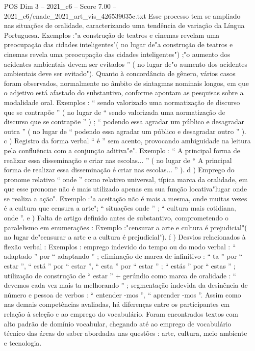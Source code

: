 \begin{textsample}{POS Dim 3 – 2021\_c6 – Score 7.00 – 2021\_c6/enade\_2021\_art\_vis\_426539035c.txt}
Esse processo tem se ampliado nas situações de oralidade, caracterizando uma tendência de variação da Língua Portuguesa.
Exemplos :"a construção de teatros e cinemas revelam uma preocupação das cidades inteligentes"( no lugar de"a construção de teatros e cinemas revela uma preocupação das cidades inteligentes") ;"o aumento dos acidentes ambientais devem ser evitados ” ( no lugar de"o aumento dos acidentes ambientais deve ser evitado").
Quanto à concordância de gênero, vários casos foram observados, normalmente no âmbito de sintagmas nominais longos, em que o adjetivo está afastado do substantivo, conforme apontam as pesquisas sobre a modalidade oral.
Exemplos : “ sendo valorizado uma normatização de discurso que se contrapõe ” ( no lugar de “ sendo valorizada uma normatização de discurso que se contrapõe ” ) ; “ podendo essa agradar um público e desagradar outra ” ( no lugar de “ podendo essa agradar um público e desagradar outro ” ). c ) Registro da forma verbal “ é ” sem acento, provocando ambiguidade na leitura pela confluência com a conjunção aditiva"e".
Exemplo : “ A principal forma de realizar essa disseminação e criar nas escolas... ” ( no lugar de “ A principal forma de realizar essa disseminação é criar nas escolas... ” ). d ) Emprego do pronome relativo “ onde ” como relativo universal, típica marca da oralidade, em que esse pronome não é mais utilizado apenas em sua função locativa"lugar onde se realiza a ação".
Exemplo :"a aceitação não é mais a mesma, onde muitas vezes é a cultura que censura a arte"; “ situações onde ” ; “ cultura mais cotidiana, onde ”. e ) Falta de artigo definido antes de substantivo, comprometendo o paralelismo em enumerações : Exemplo :"censurar a arte e cultura é prejudicial"( no lugar de"censurar a arte e a cultura é prejudicial"). f ) Desvios relacionados à flexão verbal : Exemplos : emprego indevido do tempo ou do modo verbal : “ adaptado ” por “ adaptando ” ; eliminação de marca de infinitivo : “ ta ” por “ estar ”, “ está ” por “ estar ”, “ esta ” por “ estar ” ; “ estás ” por “ estas ” ; utilização de construção de “ estar ” + gerúndio como marca de oralidade : “ devemos cada vez mais ta melhorando ” ; segmentação indevida da desinência de número e pessoa de verbos : “ entender -mos ”, “ aprender -mos ”.
Assim como nas demais competências avaliadas, há diferenças entre os participantes em relação à seleção e ao emprego do vocabulário.
Foram encontrados textos com alto padrão de domínio vocabular, chegando até ao emprego de vocabulário técnico das áreas do saber abordadas nas questões : arte, cultura, meio ambiente e tecnologia.

\end{textsample}
